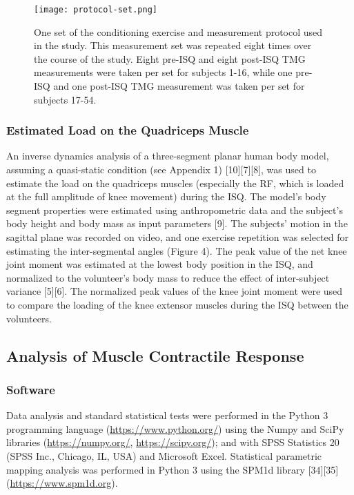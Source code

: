 \documentclass[utf8]{style/FrontiersinHarvard}
\begin{document}
\begin{figure}
	\centering
    \texttt{[image: protocol-set.png]}
    \caption{One set of the conditioning exercise and measurement protocol used in the study.
    This measurement set was repeated eight times over the course of the study.
    Eight pre-ISQ and eight post-ISQ TMG measurements were taken per set for subjects 1-16, while one pre-ISQ and one post-ISQ TMG measurement was taken per set for subjects 17-54.}
    \label{fig:protocol}
\end{figure}

\subsubsection{Estimated Load on the Quadriceps Muscle}
An inverse dynamics analysis of a three-segment planar human body model, assuming a quasi-static condition (see Appendix 1) [10][7][8], was used to estimate the load on the quadriceps muscles (especially the RF, which is loaded at the full amplitude of knee movement) during the ISQ.
The model's body segment properties were estimated using anthropometric data and the subject’s body height and body mass as input parameters [9].
The subjects' motion in the sagittal plane was recorded on video, and one exercise repetition was selected for estimating the inter-segmental angles (Figure 4).
The peak value of the net knee joint moment was estimated at the lowest body position in the ISQ,
and normalized to the volunteer’s body mass to reduce the effect of inter-subject variance [5][6].
The normalized peak values of the knee joint moment were used to compare the loading of the knee extensor muscles during the ISQ between the volunteers.

\subsection{Analysis of Muscle Contractile Response}

\subsubsection{Software}
Data analysis and standard statistical tests were performed in the Python 3 programming language (\url{https://www.python.org/}) using the Numpy and SciPy libraries (\url{https://numpy.org/}, \url{https://scipy.org/});
and with SPSS Statistics 20 (SPSS Inc., Chicago, IL, USA) and Microsoft Excel.
Statistical parametric mapping analysis was performed in Python 3 using the SPM1d library [34][35] (\url{https://www.spm1d.org}).
\end{document}
